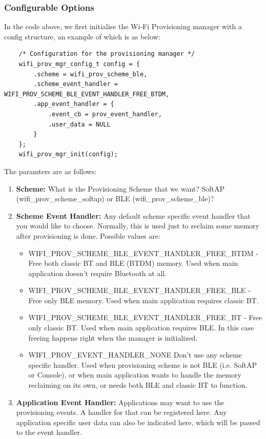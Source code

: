 \documentclass[main.tex]{subfiles}
\begin{document}
\subsubsection{Configurable Options}
In the code above, we first initialise the Wi-Fi Provisioning manager with a config structure, an example of which is as below:
\begin{verbatim}
    /* Configuration for the provisioning manager */
    wifi_prov_mgr_config_t config = {
        .scheme = wifi_prov_scheme_ble,
        .scheme_event_handler = WIFI_PROV_SCHEME_BLE_EVENT_HANDLER_FREE_BTDM,
        .app_event_handler = {
            .event_cb = prov_event_handler,
            .user_data = NULL
        }
    };
    wifi_prov_mgr_init(config);
\end{verbatim}

The paramters are as follows:
\begin{enumerate}
    \item \textbf{Scheme:} What is the Provisioning Scheme that we want? SoftAP (wifi\_prov\_scheme\_softap) or BLE (wifi\_prov\_scheme\_ble)?
    \item \textbf{Scheme Event Handler:} Any default scheme specific event handler that you would like to choose. Normally, this is used just to reclaim some memory after provisioning is done. Possible values are:
    \begin{itemize}
        \item WIFI\_PROV\_SCHEME\_BLE\_EVENT\_HANDLER\_FREE\_BTDM - Free both classic BT and BLE (BTDM) memory. Used when main application doesn’t require Bluetooth at all.
        \item WIFI\_PROV\_SCHEME\_BLE\_EVENT\_HANDLER\_FREE\_BLE - Free only BLE memory. Used when main application requires classic BT.
        \item WIFI\_PROV\_SCHEME\_BLE\_EVENT\_HANDLER\_FREE\_BT - Free only classic BT. Used when main application requires BLE. In this case freeing happens right when the manager is initialized.
        \item WIFI\_PROV\_EVENT\_HANDLER\_NONE Don’t use any scheme specific handler. Used when provisioning scheme is not BLE (i.e. SoftAP or Console), or when main application wants to handle the memory reclaiming on its own, or needs both BLE and classic BT to function.
    \end{itemize}
    \item \textbf{Application Event Handler:} Applications may want to use the provisioning events. A handler for that can be registered here. Any application specific user data can also be indicated here, which will be passed to the event handler.
\end{enumerate}
\end{document}
